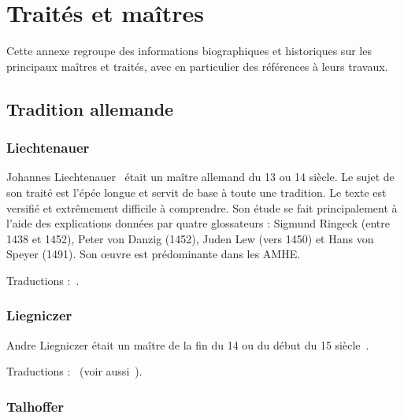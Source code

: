 \chapter{Traités et maîtres}


Cette annexe regroupe des informations biographiques et historiques sur les principaux maîtres et traités, avec en particulier des références à leurs travaux.


\section{Tradition allemande}


\subsection{Liechtenauer}
\label{app:maitres:liechtenauer}

Johannes Liechtenauer~\cite{wiktenauer:liechtenauer} était un maître allemand du 13\ieme{} ou 14\ieme{} siècle.
Le sujet de son traité est l'épée longue et servit de base à toute une tradition.
Le texte est versifié et extrêmement difficile à comprendre.
Son étude se fait principalement à l'aide des explications données par quatre glossateurs : Sigmund Ringeck (entre 1438 et 1452), Peter von Danzig (1452), Juden Lew (vers 1450) et Hans von Speyer (1491).
Son œuvre est prédominante dans les AMHE.

Traductions :~\cite{Liechtenauer:Ardamhe:2010:Tetraptyque, Ringeck:Farrell:2014:CodexRingeck, lindholm:ringeck_longsword:2008}.


\subsection{Liegniczer}
\label{app:maitres:liegniczer}

Andre Liegniczer était un maître de la fin du 14\ieme{} ou du début du 15\ieme{} siècle~\cite{wiktenauer:liegniczer}.

Traductions :~\cite{ardamhe:liegniczer, lindholm:ringeck_others:2006} (voir aussi~\cite{youtube:sala_armi:liegniczer, youtube:memag:liegniczer}).


\subsection{Talhoffer}
\label{app:maitres:talhoffer}

